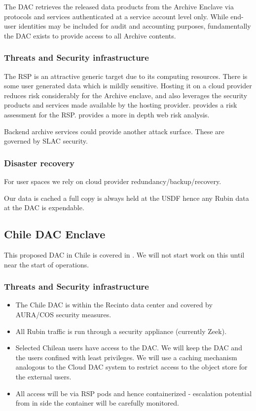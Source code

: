 The DAC retrieves the released data products from the \gls{Archive} Enclave via protocols and services authenticated at a service account level only. While end-user identities may be included for audit and accounting purposes, fundamentally the DAC exists to provide access to all \gls{Archive} contents.

\subsubsection{ Threats and Security infrastructure}
The \gls{RSP} is  an attractive generic target due to its computing resources.
There is some user generated data which is mildly sensitive.
Hosting it on a cloud provider reduces risk considerably for the Archive enclave, and also leverages the security products and services made available by the hosting provider.
 provides a risk assessment for the \gls{RSP}.
 provides a more in depth web risk analysis.

Backend archive services could provide another attack surface.
These are governed by \gls{SLAC} security.

\subsubsection{Disaster recovery}
For user  spaces we rely on cloud provider redundancy/backup/recovery.

Our data is cached a full copy is always held at the \gls{USDF} hence any Rubin data at the DAC is expendable.

\subsection{ Chile \gls{DAC} Enclave}
This proposed DAC in Chile is covered in \cite{LDM-572}.
We will not start work on this until near the start of operations.
\subsubsection{ Threats and Security infrastructure}

\begin{itemize}
\item The Chile DAC is within the Recinto data center and covered by AURA/COS security measures.\item All Rubin traffic is run through a security appliance (currently Zeek).
\item Selected Chilean users have access to the DAC. We will keep the DAC and the users confined with least privileges. We will use a caching mechanism analogous to the Cloud DAC system to restrict access to the object store for the external users.
\item All access will be via \gls{RSP} pods and hence containerized - escalation potential from in side the container will be carefully monitored.
\end{itemize}
